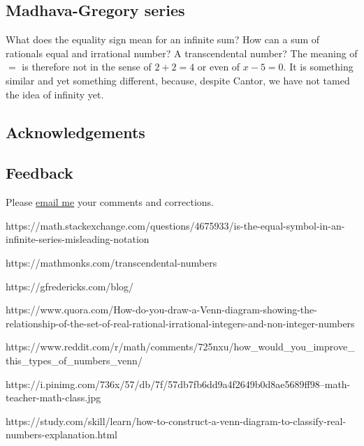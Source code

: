 \documentclass[
  a4paper,
]{article}
\begin{document}
\subsection{Madhava-Gregory series}\label{madhava-gregory-series}

What does the equality sign mean for an infinite sum? How can a sum of
rationals equal and irrational number? A transcendental number? The
meaning of \(=\) is therefore not in the sense of \(2 + 2 = 4\) or even
of \(x - 5 = 0\). It is something similar and yet something different,
because, despite Cantor, we have not tamed the idea of infinity yet.

\subsection{Acknowledgements}\label{acknowledgements}

\subsection{Feedback}\label{feedback}

Please \href{mailto:feedback.swanlotus@gmail.com}{email me} your
comments and corrections.

https://math.stackexchange.com/questions/4675933/is-the-equal-symbol-in-an-infinite-series-misleading-notation

https://mathmonks.com/transcendental-numbers

https://gfredericks.com/blog/

https://www.quora.com/How-do-you-draw-a-Venn-diagram-showing-the-relationship-of-the-set-of-real-rational-irrational-integers-and-non-integer-numbers

https://www.reddit.com/r/math/comments/725nxu/how\_would\_you\_improve\_this\_types\_of\_numbers\_venn/

https://i.pinimg.com/736x/57/db/7f/57db7fb6dd9a4f2649b0d8ae5689ff98--math-teacher-math-class.jpg

https://study.com/skill/learn/how-to-construct-a-venn-diagram-to-classify-real-numbers-explanation.html
\end{document}
